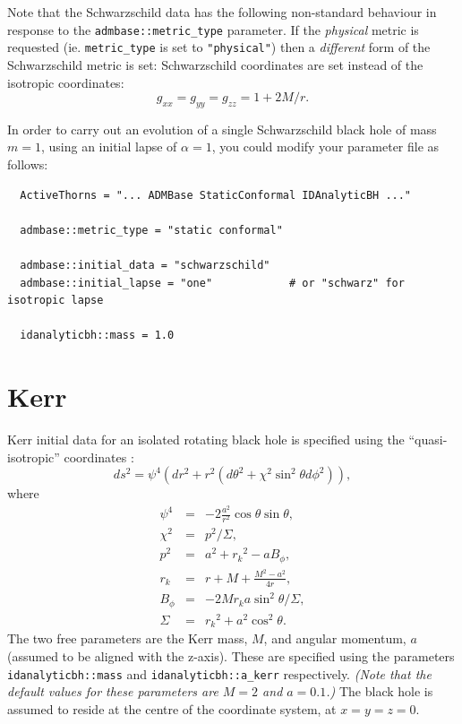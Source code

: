 \documentclass{article}
\begin{document}
Note that the Schwarzschild data has the following non-standard
behaviour in response to the \texttt{admbase::metric\_type}
parameter. If the \emph{physical} metric is requested
(ie. \texttt{metric\_type} is set to \texttt{"physical"}) then a
\emph{different} form of the Schwarzschild metric is set:
Schwarzschild coordinates are set instead of the isotropic
coordinates:
\begin{equation}
  g_{xx} = g_{yy} = g_{zz} = 1 + 2M/r.
\end{equation}


In order to carry out an evolution of a single Schwarzschild
black hole of mass $m=1$, using an initial lapse of $\alpha=1$, you
could modify your parameter file as follows:

\begin{verbatim}
  ActiveThorns = "... ADMBase StaticConformal IDAnalyticBH ..."

  admbase::metric_type = "static conformal"

  admbase::initial_data = "schwarzschild"
  admbase::initial_lapse = "one"            # or "schwarz" for isotropic lapse

  idanalyticbh::mass = 1.0
\end{verbatim}


\section{Kerr}

Kerr initial data for an isolated rotating black hole is specified
using the ``quasi-isotropic'' coordinates \cite{CactusEinstein_IDAnalyticBH_brandt-seidel:1996}:
\begin{equation}
  ds^2 = \psi^4 (dr^2 + r^2(d\theta^2 + \chi^2\sin^2\theta d\phi^2)),
\end{equation}
where
\begin{eqnarray}
  \psi^4 & = & - 2\frac{a^2}{r^2}\cos\theta\sin\theta, \\
  \chi^2 & = & p^2 / \Sigma, \\
  p^2 & = & a^2 + {r_k}^2 - a B_\phi, \\
  r_k & = & r + M + \frac{M^2 - a^2}{4r}, \\
  B_\phi & = & -2 M r_k a \sin^2\theta / \Sigma,\\
  \Sigma & = & {r_k}^2 + a^2 \cos^2\theta.
\end{eqnarray}
The two free parameters are the Kerr mass, $M$, and angular momentum,
$a$ (assumed to be aligned with the z-axis).
These are specified using the parameters
\texttt{idanalyticbh::mass} and \texttt{idanalyticbh::a\_kerr}
respectively. \emph{(Note that the default values for these parameters
are $M=2$ and $a=0.1$.)} The black hole is assumed to reside at the
centre of the coordinate system, at $x=y=z=0$.
\end{document}
